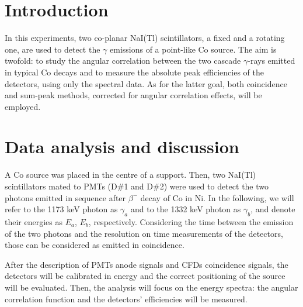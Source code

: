 \documentclass[a4paper]{article}
\begin{document}
\thispagestyle{empty} %
\clearpage


\section{Introduction} 
\setcounter{page}{1} 
In this experiments, two co-planar NaI(Tl) scintillators, a fixed and a rotating one, are used to detect the $\gamma$ emissions of a point-like Co source. 
The aim is twofold: to study the angular correlation between the two cascade $\gamma$-rays emitted in typical Co decays and to measure the absolute peak efficiencies of the detectors, using only the spectral data. As for the latter goal, both coincidence and sum-peak methods, corrected for angular correlation effects, will be employed.

\section{Data analysis and discussion} 
A Co source was placed in the centre of a support. Then, two NaI(Tl) scintillators mated to PMTs (D\#1 and D\#2) were used to detect the two photons emitted in sequence after $\beta^-$ decay of Co in Ni. In the following, we will refer to the 1173 keV photon as $\gamma_a$ and to the 1332 keV photon as $\gamma_b$, and denote their energies as $E_a$, $E_b$, respectively. Considering the time between the emission of the two photons and the resolution on time measurements of the detectors, those can be considered as emitted in coincidence.  

After the description of PMTs anode signals and CFDs coincidence signals, the detectors will be calibrated in energy and the correct positioning of the source will be evaluated. Then, the analysis will focus on the energy spectra: the angular correlation function and the detectors' efficiencies will be measured.


\end{document}
